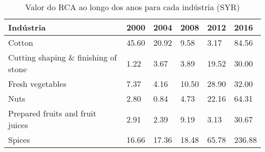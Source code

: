 \begin{table}
\centering
\caption{Valor do RCA ao longo dos anos para cada indústria (SYR)}
\begin{tabular}{p{6cm}p{1.5cm}p{1.5cm}p{1.5cm}p{1.5cm}p{1.5cm}}
\toprule
                           Indústria &  2000 &  2004 &  2008 &  2012 &   2016 \\
\midrule
                              Cotton & 45.60 & 20.92 &  9.58 &  3.17 &  84.56 \\
Cutting shaping \& finishing of stone &  1.22 &  3.67 &  3.89 & 19.52 &  30.00 \\
                    Fresh vegetables &  7.37 &  4.16 & 10.50 & 28.90 &  32.00 \\
                                Nuts &  2.80 &  0.84 &  4.73 & 22.16 &  64.31 \\
    Prepared fruits and fruit juices &  2.91 &  2.39 &  9.19 &  3.13 &  30.67 \\
                              Spices & 16.66 & 17.36 & 18.48 & 65.78 & 236.88 \\
\bottomrule
\end{tabular}
\end{table}
